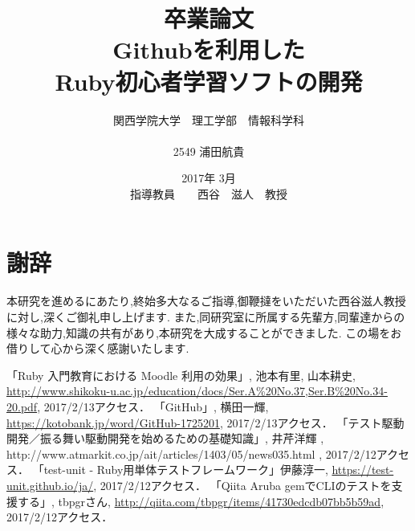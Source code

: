 \documentclass[12pt,a4paper]{jsarticle}
\begin{document}
\title{卒業論文\\
\vspace{4cm} Githubを利用した\\Ruby初心者学習ソフトの開発}
\author{ 関西学院大学　理工学部　情報科学科\\\\2549 浦田航貴}
\date{\vspace{3cm} 2017年  3月\\
\vspace{3cm} 指導教員　　西谷　滋人　教授}
\maketitle
\tableofcontents

\date{}
\maketitle





%

\section*{謝辞}
本研究を進めるにあたり,終始多大なるご指導,御鞭撻をいただいた西谷滋人教授に対し,深くご御礼申し上げます.
また,同研究室に所属する先輩方,同輩達からの様々な助力,知識の共有があり,本研究を大成することができました.
この場をお借りして心から深く感謝いたします.

\begin{flushleft}
\begin{thebibliography}{9}

「Ruby 入門教育における Moodle 利用の効果」,  池本有里, 山本耕史, \url{http://www.shikoku-u.ac.jp/education/docs/Ser.A%20No.37,Ser.B%20No.34-20.pdf}, 2017/2/13アクセス．
「GitHub」, 横田一輝, \url{https://kotobank.jp/word/GitHub-1725201}, 2017/2/13アクセス．
「テスト駆動開発／振る舞い駆動開発を始めるための基礎知識」, 井芹洋輝 , http://www.atmarkit.co.jp/ait/articles/1403/05/news035.html , 2017/2/12アクセス．
「test-unit - Ruby用単体テストフレームワーク」伊藤淳一, \url{https://test-unit.github.io/ja/}, 2017/2/12アクセス．
「Qiita Aruba gemでCLIのテストを支援する」, tbpgrさん, \url{http://qiita.com/tbpgr/items/41730edcdb07bb5b59ad}, 2017/2/12アクセス．

\end{thebibliography}
\end{flushleft}
\end{document}
